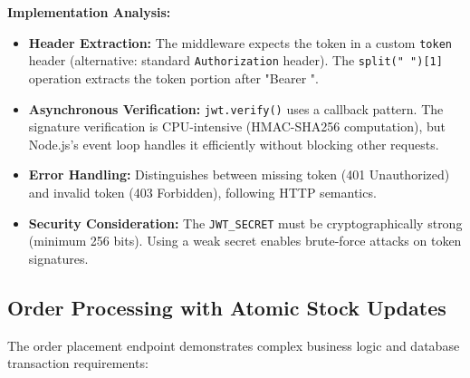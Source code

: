 \documentclass[12pt, a4paper]{report}
\begin{document}
\textbf{Implementation Analysis:}

\begin{itemize}
    \item \textbf{Header Extraction:} The middleware expects the token in a custom \texttt{token} header (alternative: standard \texttt{Authorization} header). The \texttt{split(" ")[1]} operation extracts the token portion after "Bearer ".
    
    \item \textbf{Asynchronous Verification:} \texttt{jwt.verify()} uses a callback pattern. The signature verification is CPU-intensive (HMAC-SHA256 computation), but Node.js's event loop handles it efficiently without blocking other requests.
    
    \item \textbf{Error Handling:} Distinguishes between missing token (401 Unauthorized) and invalid token (403 Forbidden), following HTTP semantics.
    
    \item \textbf{Security Consideration:} The \texttt{JWT\_SECRET} must be cryptographically strong (minimum 256 bits). Using a weak secret enables brute-force attacks on token signatures.
\end{itemize}

\subsection{Order Processing with Atomic Stock Updates}

The order placement endpoint demonstrates complex business logic and database transaction requirements:
\end{document}
